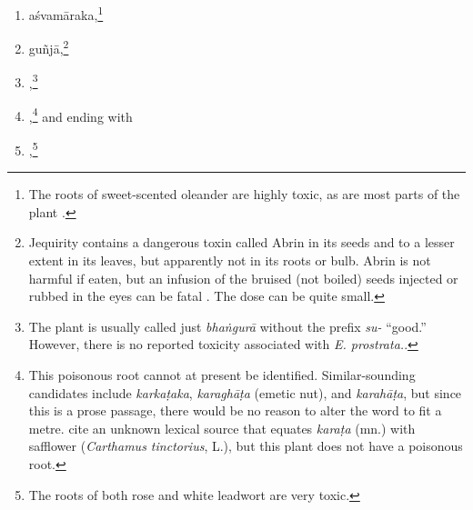 \begin{translation}
\begin{itemize}
\begin{enumerate}
        \item \gls{aśvamāraka},\footnote{The roots of sweet-scented oleander 
        are highly toxic, as are most parts of the plant \citep{pill-2019}.}
    
        \item \gls{guñjā},\footnote{Jequirity contains a dangerous
        toxin called Abrin in its seeds and to a lesser extent in its leaves,
        but apparently not in its roots or bulb. Abrin is not harmful if eaten,
        but an infusion of the bruised (not boiled) seeds injected or rubbed in
        the eyes can be fatal \citep[\# 6]{NK}.  The dose can be quite small.}
        
        \item {},\footnote{The plant is
usually called just \emph{bhaṅgurā} without the prefix \emph{su-} “good.”  However, there 
is no reported toxicity associated with \emph{E. prostrata.}.}
%        
        

        \item {},\footnote{This poisonous root cannot at present
be identified.  Similar-sounding candidates include \emph{karkaṭaka},
\emph{karaghāṭa} (emetic nut), and \emph{karahāṭa}, but since this is a
prose passage, there would be no reason to alter the word to fit a metre.
\citet[255]{moni-sans} cite an unknown lexical source that equates
\emph{karaṭa} (mn.) with safflower (\emph{Carthamus tinctorius}, L.), but
this plant does not have a poisonous root.} %
%
%
%
%
and ending with \item {},\footnote{The roots of both rose and white leadwort are very toxic.} 


\end{enumerate}
\end{itemize}
\end{translation}
